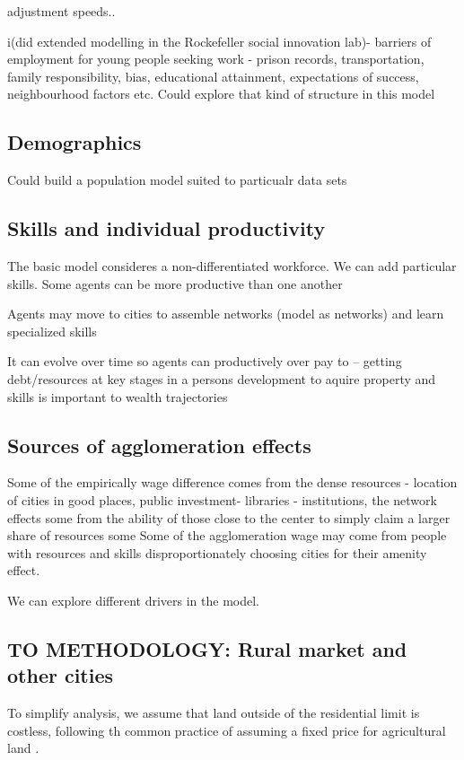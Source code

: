 adjustment speeds..
 
i(did extended modelling in the Rockefeller social innovation lab)- barriers of employment for young people seeking work
- prison records, transportation, family responsibility, bias, educational attainment, expectations of success, neighbourhood factors etc.
Could explore that kind of structure in this model

\subsection{Demographics}
Could build a population model suited to particualr data sets %

\subsection{Skills and individual productivity}
The basic model consideres a non-differentiated workforce. We can add particular skills.
Some agents can be more productive than one another

Agents may move to cities to assemble networks (model as networks)
and learn specialized skills

It can evolve over time so agents can productively over pay to  
-- getting debt/resources at key stages in a persons development to aquire property and skills is important to \gls{wealth trajectories}


\subsection{Sources of agglomeration effects}
Some of the empirically wage difference comes from the dense resources  - location of cities in good places, public investment- libraries - institutions, the network effects
some from the ability of those close to the center to simply claim a larger share of resources
some 
Some of the agglomeration wage may come from people with resources and skills disproportionately choosing cities for their amenity effect. 

We can explore different drivers in the model.


\subsection{TO METHODOLOGY: Rural market and other cities}

 To simplify analysis, we assume that land outside of the residential limit is costless, following th common practice of assuming a fixed price for agricultural land \cite{GET_fixed-price-ag-land}. 

